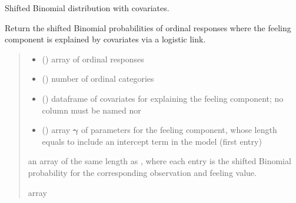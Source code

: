 \documentclass[letterpaper,10pt,english]{sphinxmanual}
\begin{document}
\begin{fulllineitems}
\label{\detokenize{cubmods:cubmods.general.bitgamma}}
\pysigstartsignatures
{}
\pysigstopsignatures
\sphinxAtStartPar
Shifted Binomial distribution with covariates.

\sphinxAtStartPar
Return the shifted Binomial probabilities of ordinal responses where the feeling component 
is explained by covariates via a logistic link.
\begin{quote}\begin{description}
\begin{itemize}
\item {} 
\sphinxAtStartPar
{} () \textendash{} array of ordinal responses

\item {} 
\sphinxAtStartPar
{} () \textendash{} number of ordinal categories

\item {} 
\sphinxAtStartPar
{} () \textendash{} dataframe of covariates for explaining the feeling component;
no column must be named  nor 

\item {} 
\sphinxAtStartPar
{} () \textendash{} array \(\pmb \gamma\) of parameters for the feeling component, whose length equals 
 to include an intercept term in the model (first entry)

\end{itemize}

\sphinxAtStartPar
an array of the same length as , where each entry is the shifted Binomial probability for
the corresponding observation and feeling value.

\sphinxAtStartPar
array

\end{description}\end{quote}

\end{fulllineitems}
\end{document}
